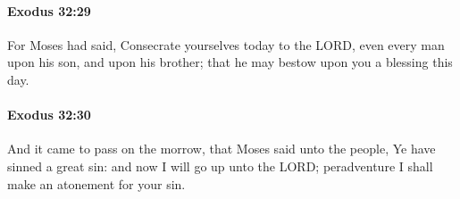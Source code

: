 		\paragraph{Exodus 32:29} %
			\label{EXODUS-32-29}

			For Moses had said, Consecrate yourselves today to the LORD, even every man upon his son, and upon his brother; that he may bestow upon you a blessing this day.


		\paragraph{Exodus 32:30} %
			\label{EXODUS-32-30}

			And it came to pass on the morrow, that Moses said unto the people, Ye have sinned a great sin: and now I will go up unto the LORD; peradventure I shall make an atonement for your sin.


